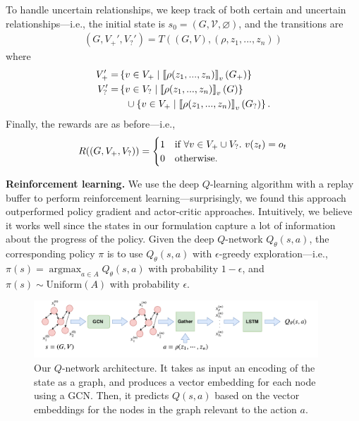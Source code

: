 To handle uncertain relationships, we keep track of both certain and uncertain relationships---i.e., the initial state is $s_0=(G,\mathcal{V},\varnothing)$, and the transitions are
\begin{align*}
(G,V_+',V_?')=T((G,V),(\rho,z_1,...,z_n))
\end{align*}
where
\begin{align*}
V_+' =& \left\{ v \in V_+ \mid \left\llbracket \rho(z_1,...,z_n) \right\rrbracket_v(G_+) \right\} \\
V_?' =& \left\{ v \in V_? \mid \left\llbracket \rho(z_1,...,z_n) \right\rrbracket_v(G) \right\} \\
     &\hspace{0.1in}\cup \left\{ v \in V_+ \mid \left\llbracket \rho(z_1,...,z_n) \right\rrbracket_v(G_?) \right\}.
\end{align*}
Finally, the rewards are as before---i.e.,
\begin{align*}
R((G,V_+,V_?))=
\begin{cases}
1&\text{if}~\forall v \in V_+ \cup V_? .\ v(z_{t}) = o_{t} \\
0&\text{otherwise}.
\end{cases}
\end{align*}

\textbf{Reinforcement learning.}
%
We use the deep $Q$-learning algorithm with a replay buffer to perform reinforcement learning---surprisingly, we found this approach outperformed policy gradient and actor-critic approaches. Intuitively, we believe it works well since the states in our formulation capture a lot of information about the progress of the policy. Given the deep $Q$-network $Q_{\theta}(s,a)$, the corresponding policy $\pi$ is to use $Q_{\theta}(s,a)$ with $\epsilon$-greedy exploration---i.e., $\pi(s)=\operatorname*{\arg\max}_{a\in A}Q_{\theta}(s,a)$ with probability $1-\epsilon$, and $\pi(s)\sim\text{Uniform}(A)$ with probability $\epsilon$.

\begin{figure}[t]
\centering
\includegraphics[width=0.95\textwidth]{Qnetwork.pdf}
\vspace{-10pt}
\caption{Our $Q$-network architecture. It takes as input an encoding of the state as a graph, and produces a vector embedding for each node using a GCN. Then, it predicts $Q(s,a)$ based on the vector embeddings for the nodes in the graph relevant to the action $a$.} 
\label{fig:mdp}
\end{figure}

